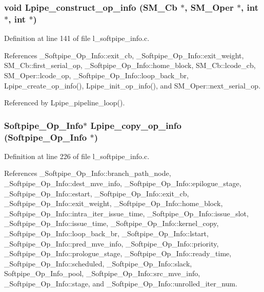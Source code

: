\subsubsection{\setlength{\rightskip}{0pt plus 5cm}void Lpipe\_\-construct\_\-op\_\-info (\bf{SM\_\-Cb} $\ast$, \bf{SM\_\-Oper} $\ast$, int $\ast$, int $\ast$)}\label{l__softpipe__info_8h_a7da7240e2af1b57604def72d2690b96}




Definition at line 141 of file l\_\-softpipe\_\-info.c.

References \_\-Softpipe\_\-Op\_\-Info::exit\_\-cb, \_\-Softpipe\_\-Op\_\-Info::exit\_\-weight, SM\_\-Cb::first\_\-serial\_\-op, \_\-Softpipe\_\-Op\_\-Info::home\_\-block, SM\_\-Cb::lcode\_\-cb, SM\_\-Oper::lcode\_\-op, \_\-Softpipe\_\-Op\_\-Info::loop\_\-back\_\-br, Lpipe\_\-create\_\-op\_\-info(), Lpipe\_\-init\_\-op\_\-info(), and SM\_\-Oper::next\_\-serial\_\-op.

Referenced by Lpipe\_\-pipeline\_\-loop().
\subsubsection{\setlength{\rightskip}{0pt plus 5cm}\bf{Softpipe\_\-Op\_\-Info}$\ast$ Lpipe\_\-copy\_\-op\_\-info (\bf{Softpipe\_\-Op\_\-Info} $\ast$)}\label{l__softpipe__info_8h_0fe00879c789bd794f722f6222a26ab2}




Definition at line 226 of file l\_\-softpipe\_\-info.c.

References \_\-Softpipe\_\-Op\_\-Info::branch\_\-path\_\-node, \_\-Softpipe\_\-Op\_\-Info::dest\_\-mve\_\-info, \_\-Softpipe\_\-Op\_\-Info::epilogue\_\-stage, \_\-Softpipe\_\-Op\_\-Info::estart, \_\-Softpipe\_\-Op\_\-Info::exit\_\-cb, \_\-Softpipe\_\-Op\_\-Info::exit\_\-weight, \_\-Softpipe\_\-Op\_\-Info::home\_\-block, \_\-Softpipe\_\-Op\_\-Info::intra\_\-iter\_\-issue\_\-time, \_\-Softpipe\_\-Op\_\-Info::issue\_\-slot, \_\-Softpipe\_\-Op\_\-Info::issue\_\-time, \_\-Softpipe\_\-Op\_\-Info::kernel\_\-copy, \_\-Softpipe\_\-Op\_\-Info::loop\_\-back\_\-br, \_\-Softpipe\_\-Op\_\-Info::lstart, \_\-Softpipe\_\-Op\_\-Info::pred\_\-mve\_\-info, \_\-Softpipe\_\-Op\_\-Info::priority, \_\-Softpipe\_\-Op\_\-Info::prologue\_\-stage, \_\-Softpipe\_\-Op\_\-Info::ready\_\-time, \_\-Softpipe\_\-Op\_\-Info::scheduled, \_\-Softpipe\_\-Op\_\-Info::slack, Softpipe\_\-Op\_\-Info\_\-pool, \_\-Softpipe\_\-Op\_\-Info::src\_\-mve\_\-info, \_\-Softpipe\_\-Op\_\-Info::stage, and \_\-Softpipe\_\-Op\_\-Info::unrolled\_\-iter\_\-num.

